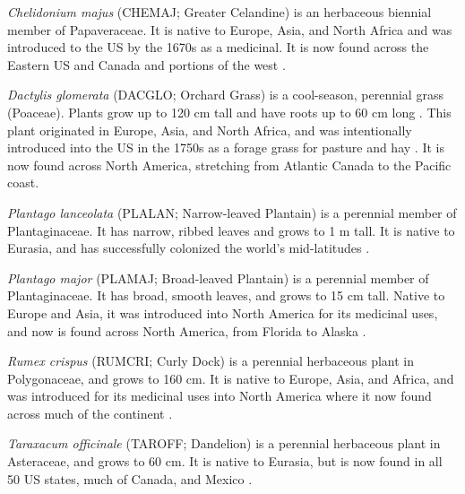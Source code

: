 \documentclass[12pt]{article}\usepackage[]{graphicx}\usepackage[]{color}
\begin{document}
	\textit{Chelidonium majus} (CHEMAJ; Greater Celandine) is an herbaceous biennial member of Papaveraceae. It is native to Europe, Asia, and North Africa and was introduced to the US by the 1670s as a medicinal. It is now found across the Eastern US and Canada and portions of the west \parencite{Holm1979}. 
	
	\textit{Dactylis glomerata} (DACGLO; Orchard Grass) is a cool-season, perennial grass (Poaceae). Plants grow up to 120 cm tall and have roots up to 60 cm long \parencite{Moser1996}. This plant originated in  Europe, Asia, and North Africa, and was intentionally introduced into the US in the 1750s \parencite{Bush2012} as a forage grass for pasture and hay \parencite{Ogle2011}.  It is now found across North America, stretching from Atlantic Canada to the Pacific coast.
	
	\textit{Plantago lanceolata} (PLALAN; Narrow-leaved Plantain) is a perennial member of  Plantaginaceae. It has narrow, ribbed leaves and grows to 1 m tall. It is native to Eurasia, and has successfully colonized the world's mid-latitudes \parencite{Holm1977}.
	
	\textit{Plantago major} (PLAMAJ; Broad-leaved Plantain) is a perennial member of Plantaginaceae. It has broad, smooth leaves, and grows to 15 cm tall. Native to Europe and Asia,  it was introduced into North America for its medicinal uses, and now is found across North America, from Florida to Alaska \parencite{Knobloch1996,Samuelsen2000}.
	
	\textit{Rumex crispus} (RUMCRI; Curly Dock) is a perennial herbaceous plant in Polygonaceae, and grows to 160 cm. It is native to Europe, Asia, and Africa, and was introduced for its medicinal uses into North America where it now found across much of the continent \parencite{USDA2010}. 
	
	\textit{Taraxacum officinale} (TAROFF; Dandelion) is a perennial herbaceous plant in Asteraceae, and grows to 60 cm. It is native to Eurasia, but is now found in all 50 US states, much of Canada, and Mexico \parencite{USDA1971}.
\end{document}
